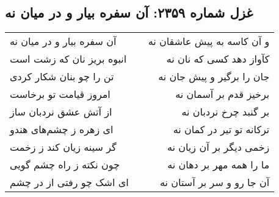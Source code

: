 \begin{center}
\section*{غزل شماره ۲۳۵۹: آن سفره بیار و در میان نه}
\label{sec:2359}
\begin{longtable}{l p{0.5cm} r}
آن سفره بیار و در میان نه
&&
و آن کاسه به پیش عاشقان نه
\\
انبوه بریز نان که زشت است
&&
کآواز دهد کسی که نان نه
\\
تن را چو بنان شکار کردی
&&
جان را برگیر و پیش جان نه
\\
امروز قیامت تو برخاست
&&
برخیز قدم بر آسمان نه
\\
از آتش عشق نردبان ساز
&&
بر گنبد چرخ نردبان نه
\\
ای زهره ز چشم‌های هندو
&&
ترکانه تو تیر در کمان نه
\\
گر سینه زیان کند ز زخمت
&&
زخمی دیگر بر آن زیان نه
\\
چون نکته ز راه چشم گویی
&&
ما را همه مهر بر دهان نه
\\
ای اشک چو رفتی از در چشم
&&
آن جا رو و سر بر آستان نه
\\
\end{longtable}
\end{center}
